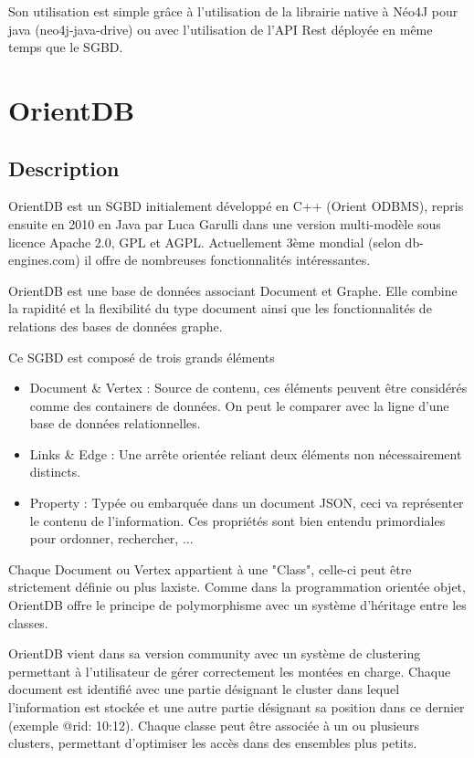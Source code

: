 \documentclass[a4paper,fleqn,12pt]{report}
\begin{document}
Son utilisation est simple grâce à l’utilisation de la librairie native à Néo4J pour java (neo4j-java-drive) ou avec l’utilisation de l’API Rest déployée en même temps que le SGBD.

\section{OrientDB}

\subsection{Description}

OrientDB est un SGBD initialement développé en C++ (Orient ODBMS), repris ensuite en 2010 en Java par Luca Garulli dans une version multi-modèle sous licence Apache 2.0, GPL et AGPL. Actuellement 3ème mondial (selon db-engines.com) il offre de nombreuses fonctionnalités intéressantes.\cite{OrientDBSite}

OrientDB est une base de données associant Document et Graphe. Elle combine la rapidité et la flexibilité du type document ainsi que les fonctionnalités de relations des bases de données graphe.

Ce SGBD est composé de trois grands éléments 

\begin{itemize}
\item Document \& Vertex : Source de contenu, ces éléments peuvent être considérés comme des containers de données. On peut le comparer avec la ligne d'une base de données relationnelles.
\item Links \& Edge : Une arrête orientée reliant deux éléments non nécessairement distincts.
\item Property : Typée ou embarquée dans un document JSON, ceci va représenter le contenu de l'information. Ces propriétés sont bien entendu primordiales pour ordonner, rechercher, ...
\end{itemize}

Chaque Document ou Vertex appartient à une "Class", celle-ci peut être strictement définie ou plus laxiste. Comme dans la programmation orientée objet, OrientDB offre le principe de polymorphisme avec un système d'héritage entre les classes. 

OrientDB vient dans sa version community avec un système de clustering permettant à l’utilisateur de gérer correctement les montées en charge. Chaque document est identifié avec une partie désignant le cluster dans lequel l’information est stockée et une autre partie désignant sa position dans ce dernier (exemple @rid: 10:12). Chaque classe peut être associée à un ou plusieurs clusters, permettant d’optimiser les accès dans des ensembles plus petits.
\end{document}

